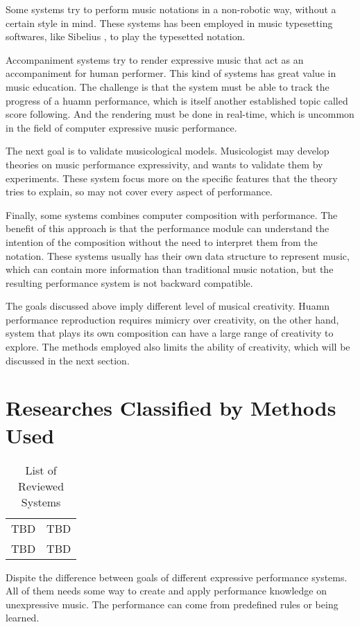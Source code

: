 Some systems try to perform music notations in a non-robotic way, without a certain style in mind. These systems has been employed in music typesetting softwares, like Sibelius \cite{sibelius}, to play the typesetted notation. 

Accompaniment systems try to render expressive music that act as an accompaniment for human performer. This kind of systems has great value in music education. The challenge is that the system must be able to track the progress of a huamn performance, which is itself another established topic called score following. And the rendering must be done in real-time, which is uncommon in the field of computer expressive music performance.

The next goal is to validate musicological models. Musicologist may develop theories on music performance expressivity, and wants to validate them by experiments. These system focus more on the specific features that the theory tries to explain, so may not cover every aspect of performance.

Finally, some systems combines computer composition with performance. The benefit of this approach is that the performance module can understand the intention of the composition without the need to interpret them from the notation. These systems usually has their own data structure to represent music, which can contain more information than traditional music notation, but the resulting performance system is not backward compatible.

The goals discussed above imply different level of musical creativity. Huamn performance reproduction requires mimicry over creativity, on the other hand, system that plays its own composition can have a large range of creativity to explore. The methods employed also limits the ability of creativity, which will be discussed in the next section.


\section{Researches Classified by Methods Used}
\begin{table}
   \centering
   \begin{tabular}{|c|c|}
      TBD & TBD\\
      TBD & TBD\\
   \end{tabular}
   \caption{List of Reviewed Systems}
   \label{tab:prevworks}
\end{table}
Dispite the difference between goals of different expressive performance systems. All of them needs some way to create and apply performance knowledge on unexpressive music. The performance can come from predefined rules or being learned. 

